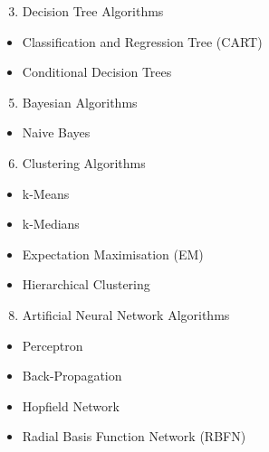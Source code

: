 \documentclass[letterpaper,11pt,english]{sphinxmanual}
\begin{document}
\begin{enumerate}
\setcounter{enumi}{2}
\item {} 
Decision Tree Algorithms

\end{enumerate}
\begin{itemize}
\item {} 
Classification and Regression Tree (CART)

\item {} 
Conditional Decision Trees

\end{itemize}
\begin{enumerate}
\setcounter{enumi}{4}
\item {} 
Bayesian Algorithms

\end{enumerate}
\begin{itemize}
\item {} 
Naive Bayes

\end{itemize}
\begin{enumerate}
\setcounter{enumi}{5}
\item {} 
Clustering Algorithms

\end{enumerate}
\begin{itemize}
\item {} 
k-Means

\item {} 
k-Medians

\item {} 
Expectation Maximisation (EM)

\item {} 
Hierarchical Clustering

\end{itemize}
\begin{enumerate}
\setcounter{enumi}{7}
\item {} 
Artificial Neural Network Algorithms

\end{enumerate}
\begin{itemize}
\item {} 
Perceptron

\item {} 
Back-Propagation

\item {} 
Hopfield Network

\item {} 
Radial Basis Function Network (RBFN)

\end{itemize}
\end{document}
